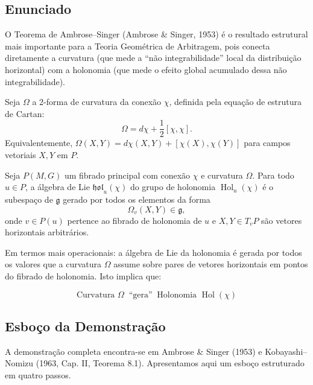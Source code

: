 \subsection{Enunciado}

O Teorema de Ambrose--Singer (Ambrose \& Singer, 1953) \'e o resultado estrutural mais importante para a Teoria Geom\'etrica de Arbitragem, pois conecta diretamente a curvatura (que mede a ``n\~ao integrabilidade'' local da distribui\c{c}\~ao horizontal) com a holonomia (que mede o efeito global acumulado dessa n\~ao integrabilidade).

Seja \(\Omega\) a 2-forma de curvatura da conex\~ao \(\chi\), definida pela equa\c{c}\~ao de estrutura de Cartan:
\begin{equation}\label{eq:cartan-structure}
 \Omega = d\chi + \frac{1}{2}[\chi, \chi].
\end{equation}
Equivalentemente, \(\Omega(X,Y) = d\chi(X,Y) + [\chi(X), \chi(Y)]\) para campos vetoriais \(X,Y\) em \(P\).

\begin{teo}\label{teo:ambrose-singer}
Seja \(P(M,G)\) um fibrado principal com conex\~ao \(\chi\) e curvatura \(\Omega\). Para todo \(u \in P\), a \'algebra de Lie \(\mathfrak{hol}_u(\chi)\) do grupo de holonomia \(\operatorname{Hol}_u(\chi)\) \'e o subespa\c{c}o de \(\mathfrak{g}\) gerado por todos os elementos da forma
\begin{equation}\label{eq:as-generators}
 \Omega_v(X,Y) \in \mathfrak{g},
\end{equation}
onde \(v \in P(u)\) pertence ao fibrado de holonomia de \(u\) e \(X,Y \in T_v P\) s\~ao vetores horizontais arbitr\'arios.
\end{teo}

Em termos mais operacionais: a \'algebra de Lie da holonomia \'e gerada por todos os valores que a curvatura \(\Omega\) assume sobre pares de vetores horizontais em pontos do fibrado de holonomia. Isto implica que:

\[
\boxed{\text{Curvatura } \Omega \;\; \text{``gera''} \;\; \text{Holonomia } \operatorname{Hol}(\chi)}
\]

\subsection{Esbo\c{c}o da Demonstra\c{c}\~ao}

A demonstra\c{c}\~ao completa encontra-se em Ambrose \& Singer (1953) e Kobayashi--Nomizu (1963, Cap. II, Teorema 8.1). Apresentamos aqui um esbo\c{c}o estruturado em quatro passos.

